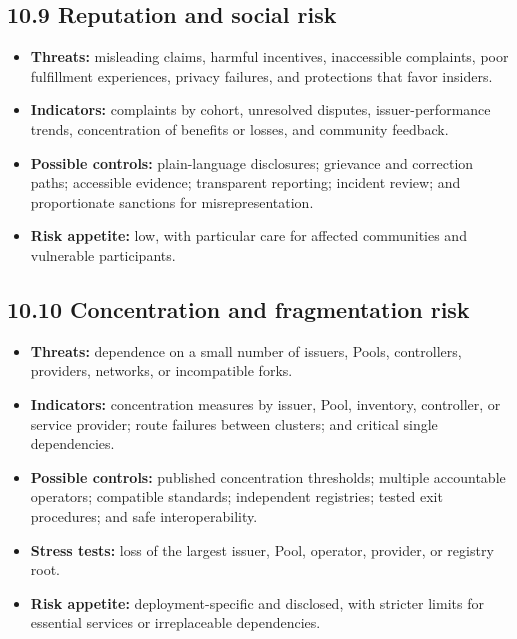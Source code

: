 \documentclass[11pt]{article}
\begin{document}
\subsection*{10.9 Reputation and social risk}

\begin{itemize}[leftmargin=*]
\item \textbf{Threats:} misleading claims, harmful incentives, inaccessible complaints, poor fulfillment experiences, privacy failures, and protections that favor insiders.
\item \textbf{Indicators:} complaints by cohort, unresolved disputes, issuer-performance trends, concentration of benefits or losses, and community feedback.
\item \textbf{Possible controls:} plain-language disclosures; grievance and correction paths; accessible evidence; transparent reporting; incident review; and proportionate sanctions for misrepresentation.
\item \textbf{Risk appetite:} low, with particular care for affected communities and vulnerable participants.
\end{itemize}
\subsection*{10.10 Concentration and fragmentation risk}

\begin{itemize}[leftmargin=*]
\item \textbf{Threats:} dependence on a small number of issuers, Pools, controllers, providers, networks, or incompatible forks.
\item \textbf{Indicators:} concentration measures by issuer, Pool, inventory, controller, or service provider; route failures between clusters; and critical single dependencies.
\item \textbf{Possible controls:} published concentration thresholds; multiple accountable operators; compatible standards; independent registries; tested exit procedures; and safe interoperability.
\item \textbf{Stress tests:} loss of the largest issuer, Pool, operator, provider, or registry root.
\item \textbf{Risk appetite:} deployment-specific and disclosed, with stricter limits for essential services or irreplaceable dependencies.
\end{itemize}
\end{document}
